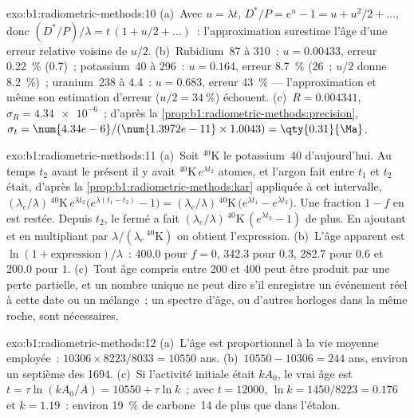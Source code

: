 \begin{solution}{exo:b1:radiometric-methods:10}
(a)~Avec $u = \lambda t$, $D^*/P = e^u - 1 = u + u^2/2 + \dots$, donc $(D^*/P)/\lambda
= t\,(1 + u/2 + \dots)$~: l'approximation surestime l'âge d'une erreur relative
voisine de $u/2$. (b)~Rubidium~87 à \qty{310}{\Ma}~: $u = 0.00433$, erreur
\qty{0.22}{\percent} (\qty{0.7}{\Ma})~; potassium~40 à \qty{296}{\Ma}~: $u =
0.164$, erreur \qty{8.7}{\percent} (\qty{26}{\Ma}~; $u/2$ donne \qty{8.2}{\percent})~;
uranium~238 à \qty{4.4}{\Ga}~: $u = 0.683$, erreur \qty{43}{\percent} ---
l'approximation et même son estimation d'erreur ($u/2 = \qty{34}{\percent}$) échouent.
(c)~$R = 0.004341$, $\sigma_R = \num{4.34e-6}$~; d'après la
\cref{prop:b1:radiometric-methods:precision}, $\sigma_t =
\num{4.34e-6}/(\num{1.3972e-11} \times 1.0043) = \qty{0.31}{\Ma}$.
\end{solution}

\begin{solution}{exo:b1:radiometric-methods:11}
(a)~Soit ${}^{40}\mathrm{K}$ le potassium~40 d'aujourd'hui. Au temps $t_2$ avant
le présent il y avait ${}^{40}\mathrm{K}\,e^{\lambda t_2}$ atomes, et l'argon
fait entre $t_1$ et $t_2$ était, d'après la \cref{prop:b1:radiometric-methods:kar} appliquée
à cet intervalle, $(\lambda_e/\lambda)\,{}^{40}\mathrm{K}\,e^{\lambda
t_2}\bigl(e^{\lambda (t_1 - t_2)} - 1\bigr) = (\lambda_e/\lambda)\,
{}^{40}\mathrm{K}\,\bigl(e^{\lambda t_1} - e^{\lambda t_2}\bigr)$. Une fraction
$1 - f$ en est restée. Depuis $t_2$, le  fermé a fait
$(\lambda_e/\lambda)\,{}^{40}\mathrm{K}\,(e^{\lambda t_2} - 1)$ de plus. En ajoutant et en
multipliant par $\lambda/(\lambda_e\,{}^{40}\mathrm{K})$ on obtient l'expression.
(b)~L'âge apparent est $\ln(1 + \text{expression})/\lambda$~: \qty{400.0}{\Ma} pour
$f = 0$, \qty{342.3}{\Ma} pour $0.3$, \qty{282.7}{\Ma} pour $0.6$ et
\qty{200.0}{\Ma} pour $1$. (c)~Tout âge compris entre \qty{200}{\Ma} et
\qty{400}{\Ma} peut être produit par une perte partielle, et un nombre unique ne peut
dire s'il enregistre un événement réel à cette date ou un mélange~; un spectre d'âge,
ou d'autres horloges dans la même roche, sont nécessaires.
\end{solution}

\begin{solution}{exo:b1:radiometric-methods:12}
(a)~L'âge est proportionnel à la vie moyenne employée~: $10306 \times 8223/8033 =
\num{10550}$ ans. (b)~$10550 - 10306 = 244$ ans, environ un septième des
\num{1694}. (c)~Si l'activité initiale était $k A_0$, le vrai âge est $t = \tau
\ln(k A_0/A) = \num{10550} + \tau \ln k$~; avec $t = \num{12000}$, $\ln k =
1450/8223 = 0.176$ et $k = 1.19$~: environ \qty{19}{\percent} de carbone~14 de plus que
dans l'étalon.
\end{solution}

